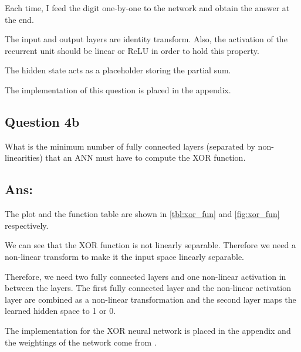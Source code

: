 \documentclass{kthreport}
\begin{document}
Each time, I feed the digit one-by-one to the network and obtain the answer at the end.

The input and output layers are identity transform.
Also, the activation of the recurrent unit should be linear or ReLU in order to hold
this property.

The hidden state acts as a placeholder storing the partial sum.

The implementation of this question is placed in the appendix.

\subsection{Question 4b}
What is the minimum number of fully connected layers (separated by non-linearities)
that an ANN must have to compute the XOR function.

\subsection*{Ans:}
The plot and the function table are shown in \cref{tbl:xor_fun} and \cref{fig:xor_fun}
respectively.

We can see that the XOR function is not linearly separable. Therefore we need a non-linear
transform to make it the input space linearly separable.

Therefore, we need two fully connected layers and one non-linear activation in between
the layers. The first fully connected layer and the non-linear activation layer
are combined as a non-linear transformation and the second layer maps the learned
hidden space to 1 or 0.


The implementation for the XOR neural network is placed in the appendix and
the weightings of the network come from \cite{Goodfellow-deeplearning-book}.
\end{document}
